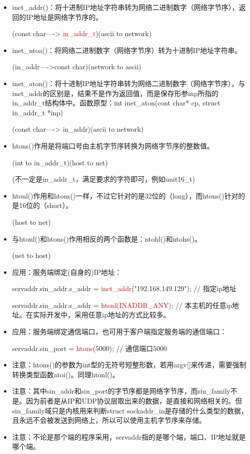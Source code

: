\documentclass[UTF8]{article}%
\begin{document}
\begin{itemize}
    \item inet\_addr()：将十进制IP地址字符串转为网络二进制数字（网络字节序），返回的IP地址是网络字节序的。
    
    (const char----> \textcolor{red}{in\_addr\_t})(ascii to network)

    \item inet\_ntoa()：将网络二进制数字（网络字节序）转为十进制IP地址字符串。
    
    (in\_addr---->const char)(network to ascii)

    \item inet\_aton()：将十进制IP地址字符串转为网络二进制数字（网络字节序），与inet\_addr的区别是，结果不是作为返回值，而是保存形参inp所指的in\_addr\_t结构体中。函数原型：int inet\_aton(cont char* cp, struct in\_addr\_t *inp)
    
    (const char----> in\_addr)(ascii to network)

    \item htons()作用是将端口号由主机字节序转换为网络字节序的整数值。
    
    (int to in\_addr\_t)(host to net)
    
    (不一定是in\_addr\_t，满足要求的字符即可，例如unit16\_t)

    \item htonl()作用和htons()一样，不过它针对的是32位的（long），而htons()针对的是16位的（short）。
    
    (host to net)

    \item 与htonl()和htons()作用相反的两个函数是：ntohl()和ntohs()。
    
    (net to host)
    
    \item 应用：服务端绑定(自身的)IP地址：

    servaddr.sin\_addr.s\_addr = \textcolor{red}{inet\_addr}("192.168.149.129");  // 指定ip地址  
    
    servaddr.sin\_addr.s\_addr = \textcolor{red}{htonl(INADDR\_ANY)};  // 本主机的任意ip地址。在实际开发中，采用任意ip地址的方式比较多。

    \item 应用：服务端绑定通信端口，也可用于客户端指定服务端的通信端口：
    
    servaddr.sin\_port = \textcolor{red}{htons}(5000);  // 通信端口5000

    \item 注意：htons()的参数为int型的无符号短整形数，若用argv[]来传递，需要强制转换类型函数atoi()。同理htonl()。
    \item 注意：其中sin\_addr和sin\_port的字节序都是网络字节序，而sin\_family不是。因为前者是从IP和UDP协议层取出来的数据，是直接和网络相关的。但sin\_family域只是内核用来判断struct sockaddr\_in是存储的什么类型的数据，且永远不会被发送到网络上，所以可以使用主机字节序来存储。
    \item 注意：不论是那个端的程序采用，servaddr指的是哪个端，端口、IP地址就是哪个端。

\end{itemize}
\end{document}
